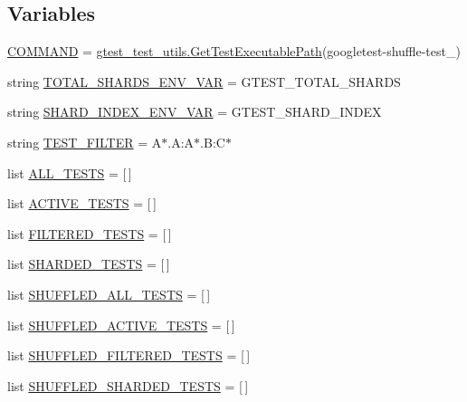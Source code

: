\subsection*{Variables}
\begin{DoxyCompactItemize}
\item 
\mbox{\hyperlink{namespacegoogletest-shuffle-test_aaa6556c1d42101405b6dc40120a8d558}{C\+O\+M\+M\+A\+ND}} = \mbox{\hyperlink{namespacegtest__test__utils_a89ed3717984a80ffbb7a9c92f71b86a2}{gtest\+\_\+test\+\_\+utils.\+Get\+Test\+Executable\+Path}}(\textquotesingle{}googletest-\/shuffle-\/test\+\_\+\textquotesingle{})
\item 
string \mbox{\hyperlink{namespacegoogletest-shuffle-test_ac2509ea0174cb21b19366da457b15d59}{T\+O\+T\+A\+L\+\_\+\+S\+H\+A\+R\+D\+S\+\_\+\+E\+N\+V\+\_\+\+V\+AR}} = \textquotesingle{}G\+T\+E\+S\+T\+\_\+\+T\+O\+T\+A\+L\+\_\+\+S\+H\+A\+R\+DS\textquotesingle{}
\item 
string \mbox{\hyperlink{namespacegoogletest-shuffle-test_a6657b8fa720718e0a5a98830a4ab8b71}{S\+H\+A\+R\+D\+\_\+\+I\+N\+D\+E\+X\+\_\+\+E\+N\+V\+\_\+\+V\+AR}} = \textquotesingle{}G\+T\+E\+S\+T\+\_\+\+S\+H\+A\+R\+D\+\_\+\+I\+N\+D\+EX\textquotesingle{}
\item 
string \mbox{\hyperlink{namespacegoogletest-shuffle-test_af6195f669ffc722f6fca899633c8cbb1}{T\+E\+S\+T\+\_\+\+F\+I\+L\+T\+ER}} = \textquotesingle{}A$\ast$.A\+:A$\ast$.B\+:C$\ast$\textquotesingle{}
\item 
list \mbox{\hyperlink{namespacegoogletest-shuffle-test_a81ef160d77cc04634a4c4dee2257aa19}{A\+L\+L\+\_\+\+T\+E\+S\+TS}} = \mbox{[}$\,$\mbox{]}
\item 
list \mbox{\hyperlink{namespacegoogletest-shuffle-test_a139508332a2fce934a41df9a6c2b2426}{A\+C\+T\+I\+V\+E\+\_\+\+T\+E\+S\+TS}} = \mbox{[}$\,$\mbox{]}
\item 
list \mbox{\hyperlink{namespacegoogletest-shuffle-test_a64c2029cc53f8e30ffbe8f063b19596e}{F\+I\+L\+T\+E\+R\+E\+D\+\_\+\+T\+E\+S\+TS}} = \mbox{[}$\,$\mbox{]}
\item 
list \mbox{\hyperlink{namespacegoogletest-shuffle-test_a366d969733d027bc719c01be5e4320c8}{S\+H\+A\+R\+D\+E\+D\+\_\+\+T\+E\+S\+TS}} = \mbox{[}$\,$\mbox{]}
\item 
list \mbox{\hyperlink{namespacegoogletest-shuffle-test_ad370fd5f9285bc7f0e0cdfa6547b83f2}{S\+H\+U\+F\+F\+L\+E\+D\+\_\+\+A\+L\+L\+\_\+\+T\+E\+S\+TS}} = \mbox{[}$\,$\mbox{]}
\item 
list \mbox{\hyperlink{namespacegoogletest-shuffle-test_ace88109d48e71fb142bd212d676ea039}{S\+H\+U\+F\+F\+L\+E\+D\+\_\+\+A\+C\+T\+I\+V\+E\+\_\+\+T\+E\+S\+TS}} = \mbox{[}$\,$\mbox{]}
\item 
list \mbox{\hyperlink{namespacegoogletest-shuffle-test_a40b3d44626a2600f58f70bfd8362c779}{S\+H\+U\+F\+F\+L\+E\+D\+\_\+\+F\+I\+L\+T\+E\+R\+E\+D\+\_\+\+T\+E\+S\+TS}} = \mbox{[}$\,$\mbox{]}
\item 
list \mbox{\hyperlink{namespacegoogletest-shuffle-test_ae1b92f7d58889a71c042a206d6659da9}{S\+H\+U\+F\+F\+L\+E\+D\+\_\+\+S\+H\+A\+R\+D\+E\+D\+\_\+\+T\+E\+S\+TS}} = \mbox{[}$\,$\mbox{]}
\end{DoxyCompactItemize}


